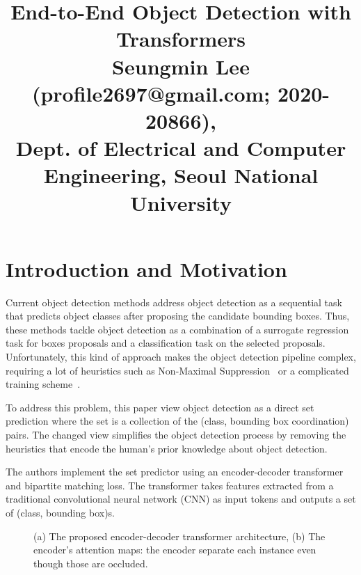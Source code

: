\documentclass[10pt,twocolumn,letterpaper]{article}
\begin{document}
\title{End-to-End Object Detection with Transformers\\ {\rm {\normalsize Seungmin Lee (profile2697@gmail.com; 2020-20866), \\Dept. of Electrical and Computer Engineering, Seoul National University}}}   %

\maketitle
\thispagestyle{empty}

\section{Introduction and Motivation}
Current object detection methods address object detection as a sequential task that predicts object classes after proposing the candidate bounding boxes. Thus, these methods tackle object detection as a combination of a surrogate regression task for boxes proposals and a classification task on the selected proposals. Unfortunately, this kind of approach makes the object detection pipeline complex, requiring a lot of heuristics such as Non-Maximal Suppression~\cite{} or a complicated training scheme~\cite{}.

To address this problem, this paper view object detection as a direct set prediction where the set is a collection of the (class, bounding box coordination) pairs. The changed view simplifies the object detection process by removing the heuristics that encode the human's prior knowledge about object detection.

The authors implement the set predictor using an encoder-decoder transformer and bipartite matching loss. The transformer takes features extracted from a traditional convolutional neural network (CNN) as input tokens and outputs a set of (class, bounding box)s. 

\begin{figure}[b]
	\centering
	\caption{(a) The proposed encoder-decoder transformer architecture, (b) The encoder's attention maps: the encoder separate each instance even though those are occluded.}
	\label{fig:imgs}
\end{figure}
\end{document}
